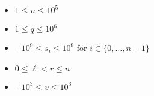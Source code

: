 \begin{itemize}
	\tightlist
	\item $1 \le n \le 10^5$
	\item $1 \le q \le 10^6$
	\item $-10^9 \le s_i \le 10^9$ for $i\in\{0,\dots,n-1\}$
	\item $0 \le \ell < r \le n$
	\item $-10^3 \le v \le 10^3$
\end{itemize}
\newpage
